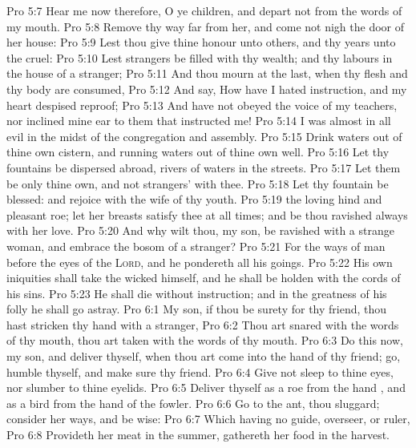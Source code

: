 \vs Pro 5:7 Hear me now therefore, O ye children, and depart not from the words of my mouth.
\vs Pro 5:8 Remove thy way far from her, and come not nigh the door of her house:
\vs Pro 5:9 Lest thou give thine honour unto others, and thy years unto the cruel:
\vs Pro 5:10 Lest strangers be filled with thy wealth; and thy labours  in the house of a stranger;
\vs Pro 5:11 And thou mourn at the last, when thy flesh and thy body are consumed,
\vs Pro 5:12 And say, How have I hated instruction, and my heart despised reproof;
\vs Pro 5:13 And have not obeyed the voice of my teachers, nor inclined mine ear to them that instructed me!
\vs Pro 5:14 I was almost in all evil in the midst of the congregation and assembly.
\vs Pro 5:15 Drink waters out of thine own cistern, and running waters out of thine own well.
\vs Pro 5:16 Let thy fountains be dispersed abroad,  rivers of waters in the streets.
\vs Pro 5:17 Let them be only thine own, and not strangers' with thee.
\vs Pro 5:18 Let thy fountain be blessed: and rejoice with the wife of thy youth.
\vs Pro 5:19  the loving hind and pleasant roe; let her breasts satisfy thee at all times; and be thou ravished always with her love.
\vs Pro 5:20 And why wilt thou, my son, be ravished with a strange woman, and embrace the bosom of a stranger?
\vs Pro 5:21 For the ways of man  before the eyes of the \textsc{Lord}, and he pondereth all his goings.
\vs Pro 5:22 His own iniquities shall take the wicked himself, and he shall be holden with the cords of his sins.
\vs Pro 5:23 He shall die without instruction; and in the greatness of his folly he shall go astray.
\vs Pro 6:1 My son, if thou be surety for thy friend,  thou hast stricken thy hand with a stranger,
\vs Pro 6:2 Thou art snared with the words of thy mouth, thou art taken with the words of thy mouth.
\vs Pro 6:3 Do this now, my son, and deliver thyself, when thou art come into the hand of thy friend; go, humble thyself, and make sure thy friend.
\vs Pro 6:4 Give not sleep to thine eyes, nor slumber to thine eyelids.
\vs Pro 6:5 Deliver thyself as a roe from the hand , and as a bird from the hand of the fowler.
\vs Pro 6:6 Go to the ant, thou sluggard; consider her ways, and be wise:
\vs Pro 6:7 Which having no guide, overseer, or ruler,
\vs Pro 6:8 Provideth her meat in the summer,  gathereth her food in the harvest.

